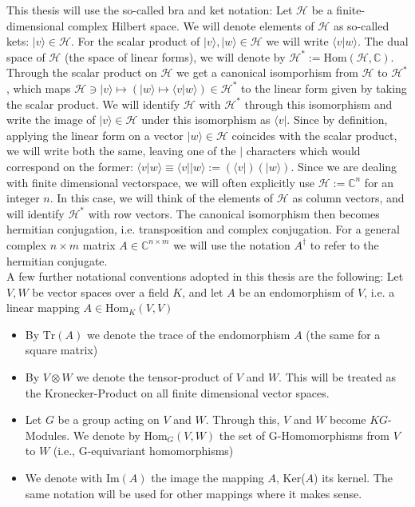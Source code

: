 \documentclass[12pt,a4paper,BCOR15mm,twoside,DIV12]{article}
\def\C{\mathbb{C}}
\def\Hom{\text{Hom}}
\def\Tr{\text{Tr}}
\theoremstyle{definition}
\begin{document}
This thesis will use the so-called bra and ket notation: Let $\mathcal{H}$ be a finite-dimensional complex Hilbert space. We will denote elements of $\mathcal{H}$ as so-called kets: $|v \rangle \in \mathcal{H}$.
For the scalar product of $|v \rangle, | w \rangle \in \mathcal{H}$ we will write $\langle v | w \rangle$. 
The dual space of $\mathcal{H}$ (the space of linear forms), we will denote by $\mathcal{H}^* := \Hom(\mathcal{H},\C)$. Through the scalar product on $\mathcal{H}$ we get a canonical isomporhism from $\mathcal{H}$ to
$\mathcal{H}^*$, which maps $\mathcal{H} \ni |v \rangle \mapsto (|w \rangle \mapsto \langle v | w \rangle) \in \mathcal{H}^*$ to the linear form given by taking the scalar product. We will identify $\mathcal{H}$ with
$\mathcal{H}^*$ through this isomorphism and write the image of $|v \rangle \in \mathcal{H}$ under this isomorphism as $\langle v |$. Since by definition, applying the linear form on a vector $ | w \rangle \in \mathcal{H}$ 
coincides with the scalar product, we will write both the same, leaving one of the $|$ characters which would correspond on the former: $ \langle v | w \rangle \equiv \langle v | | w \rangle := (\langle v |)(| w \rangle)$. 
Since we are dealing with finite dimensional vectorspace, we will often explicitly use $\mathcal{H}:= \C^n$ for an integer $n$. In this case, we will think of the elements of $\mathcal{H}$ as column vectors, and will identify
$\mathcal{H}^*$ with row vectors. The canonical isomorphism then becomes hermitian conjugation, i.e. transposition and complex conjugation. For a general complex $n \times m$ matrix $A \in \C^{n \times m}$ we will use the notation
$A^\dagger$ to refer to the hermitian conjugate. \\

A few further notational conventions adopted in this thesis are the following: 
Let $V, W$ be vector spaces over a field $K$, and let $A$ be an endomorphism of $V$, i.e. a linear mapping $A \in \Hom_K(V,V)$
\begin{itemize}
\item By $\Tr(A)$ we denote the trace of the endomorphism $A$ (the same for a square matrix)
\item By $V \otimes W$ we denote the tensor-product of $V$ and $W$. This will be treated as the Kronecker-Product on all finite dimensional vector spaces.
\item Let $G$ be a group acting on $V$ and $W$. Through this, $V$ and $W$ become $KG$-Modules. We denote by $\Hom_{G}(V,W)$ the set of G-Homomorphisms from $V$ to $W$ (i.e., G-equivariant homomorphisms)
\item We denote with Im$(A)$ the image the mapping $A$, Ker($A$) its kernel. The same notation will be used for other mappings where it makes sense.
\end{itemize} \\
\end{document}
